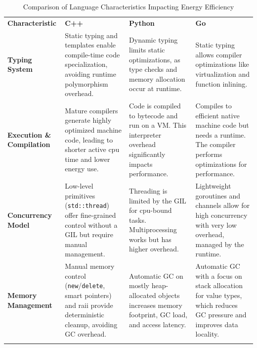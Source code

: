 \begin{table} 
	\centering
	\caption{Comparison of Language Characteristics Impacting Energy Efficiency}
	\label{tab:language_comparison_energy}
	\small
	\begin{tabularx}{\textwidth}{
		>{\raggedright\arraybackslash}p{}
		>{\raggedright\arraybackslash}X
		>{\raggedright\arraybackslash}X
		>{\raggedright\arraybackslash}X
	}
		\toprule
		\multicolumn{4}{c}{\textbf{Characteristics Impacting Performance \& Energy Efficiency}} \\
		\midrule
		\textbf{Characteristic} & \textbf{C++} & \textbf{Python} & \textbf{Go} \\
		\midrule

        \textbf{Typing System} &
		Static typing and templates enable compile-time code specialization, avoiding runtime polymorphism overhead. &
		Dynamic typing limits static optimizations, as type checks and memory allocation occur at runtime. &
		Static typing allows compiler optimizations like virtualization and function inlining. \\
        \addlinespace
		
        \textbf{Execution \& Compilation} &
		Mature compilers generate highly optimized machine code, leading to shorter active \gls{cpu} time and lower energy use. &
		Code is compiled to \gls{bytecode} and run on a \gls{VM}. This interpreter overhead significantly impacts performance. &
		Compiles to efficient native machine code but needs a runtime. The compiler performs optimizations for performance. \\
        \addlinespace
        
		\textbf{Concurrency Model} &
		Low-level primitives (\texttt{std::thread}) offer fine-grained control without a \gls{GIL} but require manual management. &
		Threading is limited by the \gls{GIL} for \gls{cpu}-bound tasks. Multiprocessing works but has higher overhead. &
		Lightweight goroutines and channels allow for high concurrency with very low overhead, managed by the runtime. \\
        \addlinespace
		
		\textbf{Memory Management} &
		Manual memory control (\texttt{new}/\texttt{delete}, smart pointers) and \gls{raii} provide deterministic cleanup, avoiding \gls{GC} overhead. &
		Automatic \gls{GC} on mostly heap-allocated objects increases memory footprint, \gls{GC} load, and access latency. &
		Automatic \gls{GC} with a focus on stack allocation for value types, which reduces \gls{GC} pressure and improves data locality. \\
        \addlinespace


\end{tabularx}
\end{table}
